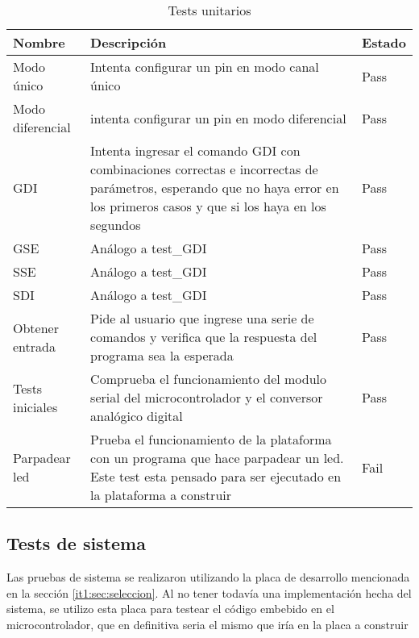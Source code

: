 \begin{table}[h]
\caption{Tests unitarios}
\label{it2:tab:tests_unitarios}
\begin{tabular}{p{2cm} p{7cm} p{2cm}}
\hline
\cellcolor[HTML]{68CBD0}Nombre & \cellcolor[HTML]{68CBD0}Descripción & \cellcolor[HTML]{68CBD0}Estado  \\ \hline
Modo único & Intenta configurar un pin en modo canal único & {\color[HTML]{009901} Pass}  \\ \hline
Modo diferencial & intenta configurar un pin en modo diferencial & {\color[HTML]{009901} Pass} \\ \hline
GDI & Intenta ingresar el comando GDI con combinaciones correctas e incorrectas de parámetros, esperando que no haya error en los primeros casos y que si los haya en los segundos & {\color[HTML]{009901} Pass} \\ \hline
GSE & Análogo a test\_GDI & {\color[HTML]{009901} Pass}  \\ \hline
SSE & Análogo a test\_GDI & {\color[HTML]{009901} Pass}  \\ \hline
SDI & Análogo a test\_GDI & {\color[HTML]{009901} Pass}  \\ \hline
Obtener entrada & Pide al usuario que ingrese una serie de comandos y verifica que la respuesta del programa sea la esperada & {\color[HTML]{009901} Pass}   \\ \hline
Tests iniciales & Comprueba el funcionamiento del modulo serial del microcontrolador y el conversor analógico digital & {\color[HTML]{009901} Pass}   \\ \hline
Parpadear led & Prueba el funcionamiento de la plataforma con un programa que hace parpadear un led. Este test esta pensado para ser ejecutado en la plataforma a construir & {\color[HTML]{CB0000} Fail}   \\
\end{tabular}
\end{table}


\subsection{Tests de sistema} %
\label{it2:sub:tests_de_sistema}

Las pruebas de sistema se realizaron utilizando la placa de desarrollo mencionada en la sección \ref{it1:sec:seleccion}. Al no tener todavía una implementación hecha del sistema, se utilizo esta placa para testear el código embebido en el microcontrolador, que en definitiva seria el mismo que iría en la placa a construir

